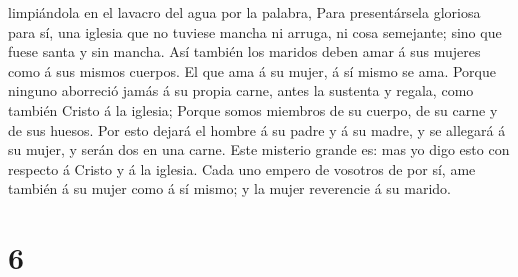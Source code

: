 limpiándola en el lavacro del agua por la palabra,  Para
presentársela gloriosa para sí, una iglesia que no tuviese mancha ni
arruga, ni cosa semejante; sino que fuese santa y sin mancha.
 Así también los maridos deben amar á sus mujeres como á
sus mismos cuerpos. El que ama á su mujer, á sí mismo se ama.
 Porque ninguno aborreció jamás á su propia carne, antes
la sustenta y regala, como también Cristo á la iglesia; 
Porque somos miembros de su cuerpo, de su carne y de sus huesos.
 Por esto dejará el hombre á su padre y á su madre, y se
allegará á su mujer, y serán dos en una carne.  Este
misterio grande es: mas yo digo esto con respecto á Cristo y á la
iglesia.  Cada uno empero de vosotros de por sí, ame
también á su mujer como á sí mismo; y la mujer reverencie á su marido.

\hypertarget{section-5}{%
\section{6}\label{section-5}}

